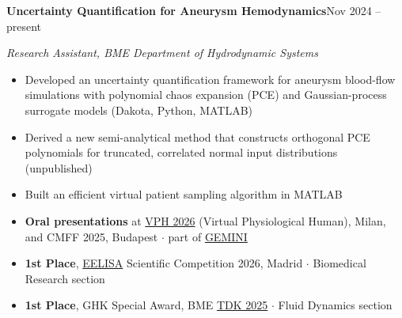 \documentclass[10pt,a4paper]{article}
\newlength{\sidewidth}\setlength{\sidewidth}{0.27\textwidth}
\newlength{\colgap}\setlength{\colgap}{1.3em}
\newlength{\mainwidth}\setlength{\mainwidth}{\dimexpr\textwidth-\sidewidth-\colgap\relax}
\newcommand{\cventry}[4]{%
    {\bfseries #1}\hfill{\small\color{subtle}#2}\par
    {\itshape #3}\par
    \vspace{1pt}%
    #4%
    \par\vspace{0.12cm plus 0.5fill}%
}
\newenvironment{outcomes}{%
    \begin{itemize}[label={\color{accent}\small\faCaretRight}, leftmargin=1em, topsep=2pt]%
}{\end{itemize}}
\begin{document}
\begin{minipage}[t][\dimexpr\textheight-12pt\relax][s]{\mainwidth}
\cventry{Uncertainty Quantification for Aneurysm Hemodynamics}{Nov 2024 -- present}
{Research Assistant, BME Department of Hydrodynamic Systems}
{\begin{itemize}
    \item Developed an uncertainty quantification framework for aneurysm blood-flow simulations with polynomial chaos expansion (PCE) and Gaussian-process surrogate models (Dakota, Python, MATLAB)
    \item Derived a new semi-analytical method that constructs orthogonal PCE polynomials for truncated, correlated normal input distributions (unpublished)
    \item Built an efficient virtual patient sampling algorithm in MATLAB
\end{itemize}
\begin{outcomes}
    \item \textbf{Oral presentations} at \href{https://vph-conference.org/wp-content/uploads/sites/30/2026/08/VPH-2026-Abstract-book_reduced.pdf\#page=493}{VPH 2026} (Virtual Physiological Human), Milan, and CMFF 2025, Budapest \quad $\cdot$ \quad part of \href{https://cordis.europa.eu/project/id/101136438}{GEMINI}
    \item \textbf{1st Place}, \href{https://scientific.eelisa.bme.hu/conference/EELISA/2026/sessions/gggfd/paper/Evaluating-uncertainty-quantification-methods}{EELISA} Scientific Competition 2026, Madrid {\small\color{subtle} \;$\cdot$\; Biomedical Research section}
    \item \textbf{1st Place}, GHK Special Award, BME \href{https://tdk.bme.hu/ConferenceFiles/GPK/2025/Paper/Szamitasi-bizonytalansagok-szamszerusitese-egy-20251109-161003.pdf?paperId=16818}{TDK 2025}{\small\color{subtle} \;$\cdot$\; Fluid Dynamics section}
\end{outcomes}}




\end{minipage}
\end{document}
